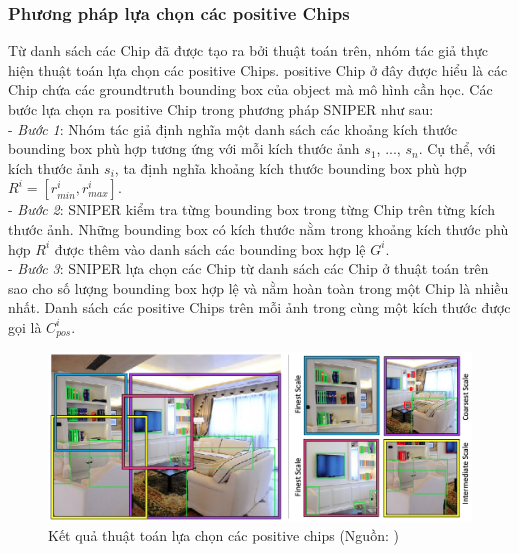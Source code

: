 {    \subsubsection*{Phương pháp lựa chọn các positive Chips}
    Từ danh sách các Chip đã được tạo ra bởi thuật toán trên, nhóm tác giả thực hiện thuật toán lựa chọn các positive Chips.
    positive Chip ở đây được hiểu là các Chip chứa các groundtruth  bounding box  của object mà mô hình cần học.
    Các bước lựa chọn ra positive Chip trong phương pháp SNIPER  như sau: \\
    - \textit{Bước 1}: Nhóm tác giả định nghĩa một danh sách các khoảng kích thước bounding box  phù hợp tương ứng với mỗi kích thước ảnh {${s}_{1}$, ..., ${s}_{n}$}.
    Cụ thể, với kích thước ảnh ${s}_{i}$, ta định nghĩa khoảng kích thước bounding box  phù hợp ${R}^{i} = [{r}_{min}^{i}, {r}_{max}^{i}]$. \\
    - \textit{Bước 2}: SNIPER  kiểm tra từng bounding box  trong từng Chip trên từng kích thước ảnh.
    Những bounding box  có kích thước nằm trong khoảng kích thước phù hợp ${R}^{i}$ được thêm vào danh sách các bounding box  hợp lệ ${G}^{i}$. \\
    - \textit{Bước 3}: SNIPER  lựa chọn các Chip từ danh sách các Chip ở thuật toán trên sao cho số lượng bounding box  hợp lệ và nằm hoàn toàn trong một Chip là nhiều nhất.
    Danh sách các positive Chips trên mỗi ảnh trong cùng một kích thước được gọi là ${C}_{pos}^{i}$.

    \begin{figure}[H]
        \centering
        \includegraphics[width=13cm] {images/sniper_pos_chip}
        \caption{Kết quả thuật toán lựa chọn các positive chips (Nguồn: \cite{singh2018sniper})}
        \label{fig:sniper_pos_chip}
    \end{figure}

}
